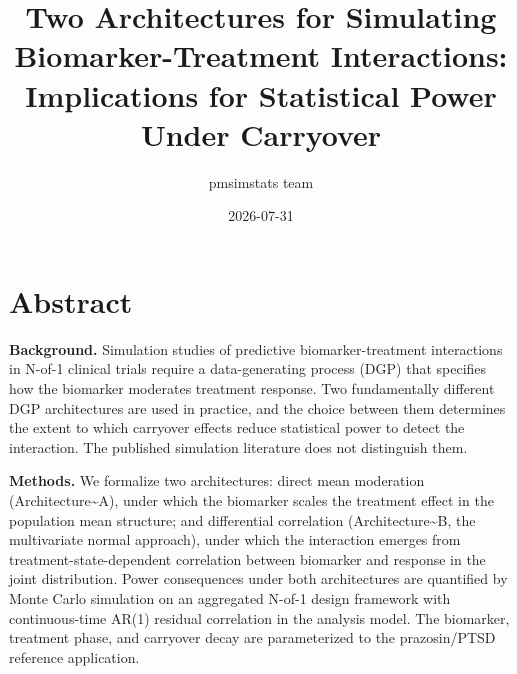 \documentclass[
  11pt,
]{article}
\title{Two Architectures for Simulating Biomarker-Treatment
Interactions: Implications for Statistical Power Under Carryover}
\author{pmsimstats team}
\date{2026-07-31}
\begin{document}
\maketitle

{
\setcounter{tocdepth}{2}
\tableofcontents
}
\section{Abstract}

\textbf{Background.} Simulation studies of predictive
biomarker-treatment interactions in N-of-1 clinical trials require a
data-generating process (DGP) that specifies how the biomarker moderates
treatment response. Two fundamentally different DGP architectures are
used in practice, and the choice between them determines the extent to
which carryover effects reduce statistical power to detect the
interaction. The published simulation literature does not distinguish
them.

\textbf{Methods.} We formalize two architectures: direct mean moderation
(Architecture\textasciitilde A), under which the biomarker scales the
treatment effect in the population mean structure; and differential
correlation (Architecture\textasciitilde B, the multivariate normal
approach), under which the interaction emerges from
treatment-state-dependent correlation between biomarker and response in
the joint distribution. Power consequences under both architectures are
quantified by Monte Carlo simulation on an aggregated N-of-1 design
framework with continuous-time AR(1) residual correlation in the
analysis model. The biomarker, treatment phase, and carryover decay are
parameterized to the prazosin/PTSD reference application.
\end{document}
